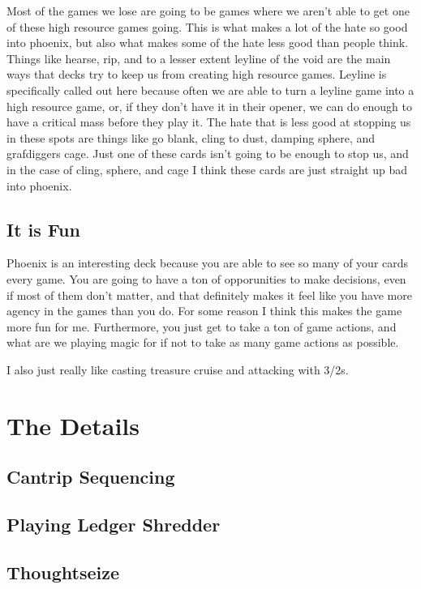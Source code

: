 \documentclass[12pt]{article}
\begin{document}
Most of the games we lose are going to be games where we aren't able to get one of these high resource games going. This is what makes a lot of the hate so good into phoenix, but also what makes some of the hate less good than people think. Things like hearse, rip, and to a lesser extent leyline of the void are the main ways that decks try to keep us from creating high resource games. Leyline is specifically called out here because often we are able to turn a leyline game into a high resource game, or, if they don't have it in their opener, we can do enough to have a critical mass before they play it. The hate that is less good at stopping us in these spots are things like go blank, cling to dust, damping sphere, and grafdiggers cage. Just one of these cards isn't going to be enough to stop us, and in the case of cling, sphere, and cage I think these cards are just straight up bad into phoenix.

\subsection{It is Fun}
Phoenix is an interesting deck because you are able to see so many of your cards every game. You are going to have a ton of opporunities to make decisions, even if most of them don't matter, and that definitely makes it feel like you have more agency in the games than you do. For some reason I think this makes the game more fun for me. Furthermore, you just get to take a ton of game actions, and what are we playing magic for if not to take as many game actions as possible.

\vspace{0.4em}
\noindent I also just really like casting treasure cruise and attacking with 3/2s.

\clearpage
\section{The Details}
\subsection{Cantrip Sequencing}

\subsection{Playing Ledger Shredder}

\subsection{Thoughtseize}
\end{document}
